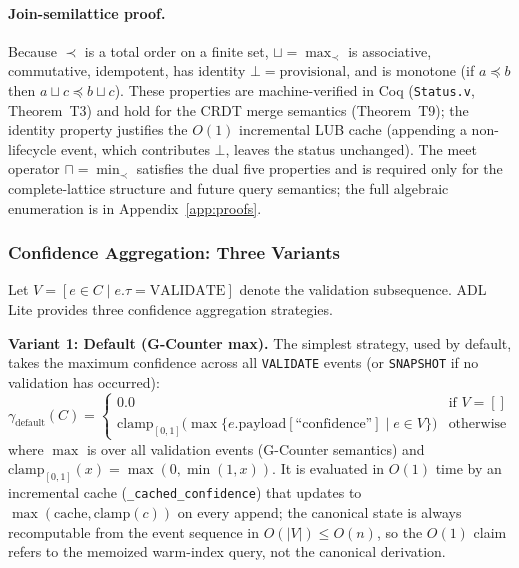\paragraph{Join-semilattice proof.} Because $\prec$ is a total order on a finite set, $\sqcup = \max_{\prec}$ is associative, commutative, idempotent, has identity $\bot=\text{provisional}$, and is monotone (if $a \preceq b$ then $a \sqcup c \preceq b \sqcup c$). These properties are machine-verified in Coq (\texttt{Status.v}, Theorem~T3) and hold for the CRDT merge semantics (Theorem~T9); the identity property justifies the $O(1)$ incremental LUB cache (appending a non-lifecycle event, which contributes $\bot$, leaves the status unchanged). The meet operator $\sqcap = \min_{\prec}$ satisfies the dual five properties and is required only for the complete-lattice structure and future query semantics; the full algebraic enumeration is in Appendix~\ref{app:proofs}.

\subsubsection{Confidence Aggregation: Three Variants}

Let $V = [e \in C \mid e.\tau = \text{VALIDATE}]$ denote the validation subsequence. ADL Lite provides three confidence aggregation strategies.

\textbf{Variant 1: Default (G-Counter max).} The simplest strategy, used by default, takes the maximum confidence across all \texttt{VALIDATE} events (or \texttt{SNAPSHOT} if no validation has occurred):
\begin{equation}\label{eq:gamma-default}
    \gamma_{\text{default}}(C) = \begin{cases}
        0.0 & \text{if } V = [] \\
        \text{clamp}_{[0,1]}\bigl(\max\{ e.\text{payload}[\text{``confidence''}] \mid e \in V \}\bigr) & \text{otherwise}
    \end{cases}
\end{equation}
where $\max$ is over all validation events (G-Counter semantics) and $\text{clamp}_{[0,1]}(x) = \max(0, \min(1, x))$. It is evaluated in $O(1)$ time by an incremental cache (\texttt{\_cached\_confidence}) that updates to $\max(\text{cache}, \text{clamp}(c))$ on every append; the canonical state is always recomputable from the event sequence in $O(|V|) \leq O(n)$, so the $O(1)$ claim refers to the memoized warm-index query, not the canonical derivation.

